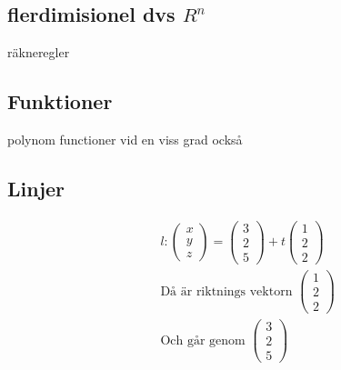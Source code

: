 \subsection{flerdimisionel dvs $R^n$}
räkneregler

\subsection{Funktioner}
polynom functioner vid en viss grad också

\subsection{Linjer}
\begin{align*}
  &\quad  l: \begin{pmatrix} x \\ y \\ z \end{pmatrix} =
  \begin{pmatrix} 3 \\ 2 \\ 5 \end{pmatrix} + t\begin{pmatrix} 1 \\ 2 \\ 2 \end{pmatrix} \\
  &\quad  \text{Då är riktnings vektorn } \begin{pmatrix} 1 \\ 2 \\ 2 \end{pmatrix} \\
  &\quad  \text{Och går genom } \begin{pmatrix} 3 \\ 2 \\ 5 \end{pmatrix} \\
\end{align*}


\newpage


